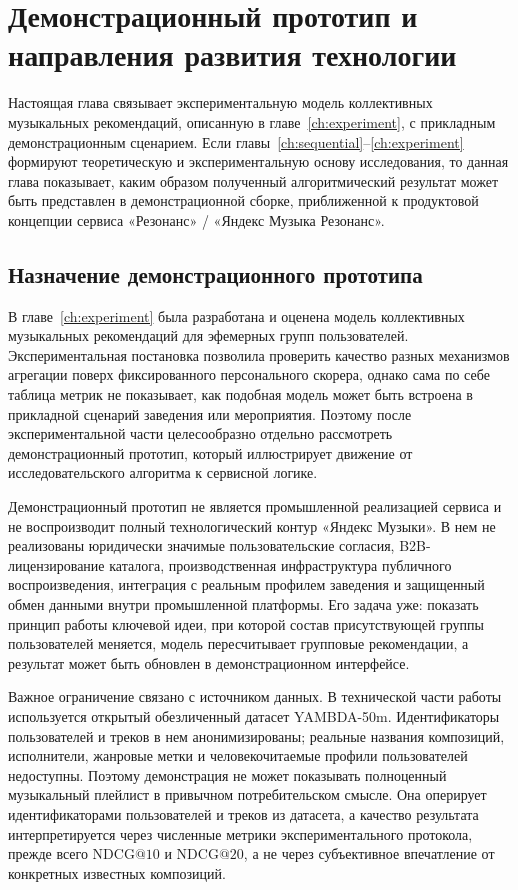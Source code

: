 \chapter{Демонстрационный прототип и направления развития технологии}
\label{ch:prototype}

Настоящая глава связывает экспериментальную модель коллективных музыкальных рекомендаций, описанную в главе~\ref{ch:experiment}, с прикладным демонстрационным сценарием. Если главы~\ref{ch:sequential}--\ref{ch:experiment} формируют теоретическую и экспериментальную основу исследования, то данная глава показывает, каким образом полученный алгоритмический результат может быть представлен в демонстрационной сборке, приближенной к продуктовой концепции сервиса «Резонанс» / «Яндекс Музыка Резонанс».

\section{Назначение демонстрационного прототипа}
\label{sec:ch6:purpose}

В главе~\ref{ch:experiment} была разработана и оценена модель коллективных музыкальных рекомендаций для эфемерных групп пользователей. Экспериментальная постановка позволила проверить качество разных механизмов агрегации поверх фиксированного персонального скорера, однако сама по себе таблица метрик не показывает, как подобная модель может быть встроена в прикладной сценарий заведения или мероприятия. Поэтому после экспериментальной части целесообразно отдельно рассмотреть демонстрационный прототип, который иллюстрирует движение от исследовательского алгоритма к сервисной логике.

Демонстрационный прототип не является промышленной реализацией сервиса и не воспроизводит полный технологический контур «Яндекс Музыки». В нем не реализованы юридически значимые пользовательские согласия, B2B-лицензирование каталога, производственная инфраструктура публичного воспроизведения, интеграция с реальным профилем заведения и защищенный обмен данными внутри промышленной платформы. Его задача уже: показать принцип работы ключевой идеи, при которой состав присутствующей группы пользователей меняется, модель пересчитывает групповые рекомендации, а результат может быть обновлен в демонстрационном интерфейсе.

Важное ограничение связано с источником данных. В технической части работы используется открытый обезличенный датасет YAMBDA-50m. Идентификаторы пользователей и треков в нем анонимизированы; реальные названия композиций, исполнители, жанровые метки и человекочитаемые профили пользователей недоступны. Поэтому демонстрация не может показывать полноценный музыкальный плейлист в привычном потребительском смысле. Она оперирует идентификаторами пользователей и треков из датасета, а качество результата интерпретируется через численные метрики экспериментального протокола, прежде всего $\mathrm{NDCG@10}$ и $\mathrm{NDCG@20}$, а не через субъективное впечатление от конкретных известных композиций.

